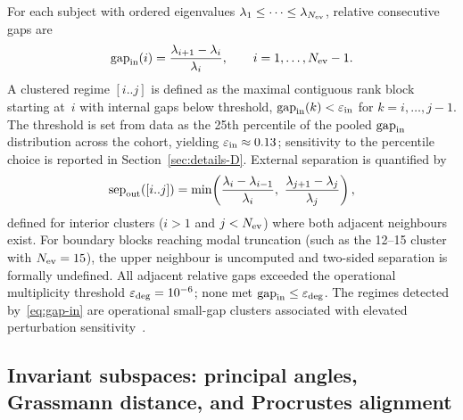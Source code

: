 \documentclass[pdflatex,sn-basic]{sn-jnl}
\begin{document}
For each subject with ordered eigenvalues $\lambda_1\le\cdots\le\lambda_{N_{\rm ev}}$, relative consecutive gaps are
\begin{equation}
\mathrm{gap}_{\rm in}(i)=\frac{\lambda_{i+1}-\lambda_i}{\lambda_i},\qquad i=1,\ldots,N_{\rm ev}-1.
\label{eq:gap-in}
\end{equation}
A clustered regime $[i..j]$ is defined as the maximal contiguous rank block starting at~$i$ with internal gaps below threshold, $\mathrm{gap}_{\rm in}(k)<\varepsilon_{\rm in}$ for $k=i,\ldots,j-1$.
The threshold is set from data as the 25th percentile of the pooled $\mathrm{gap}_{\rm in}$ distribution across the cohort, yielding $\varepsilon_{\rm in}\approx 0.13$; sensitivity to the percentile choice is reported in Section~\ref{sec:details-D}.
External separation is quantified by
\begin{equation}
\mathrm{sep}_{\rm out}([i..j])=\min\!\left(\frac{\lambda_i-\lambda_{i-1}}{\lambda_i},\ \frac{\lambda_{j+1}-\lambda_j}{\lambda_j}\right),
\label{eq:sep-out}
\end{equation}
defined for interior clusters ($i > 1$ and $j < N_{\rm ev}$) where both adjacent neighbours exist. For boundary blocks reaching modal truncation (such as the 12--15 cluster with $N_{\rm ev}=15$), the upper neighbour is uncomputed and two-sided separation is formally undefined.
All adjacent relative gaps exceeded the operational multiplicity threshold $\varepsilon_{\rm deg}=10^{-6}$; none met $\mathrm{gap}_{\rm in}\le\varepsilon_{\rm deg}$. The regimes detected by~\eqref{eq:gap-in} are operational small-gap clusters associated with elevated perturbation sensitivity~\citep{Pierre1988,ManconiMace2017}.

\subsection{Invariant subspaces: principal angles, Grassmann distance, and Procrustes alignment}
\label{sec:subspace-methods}
\end{document}
